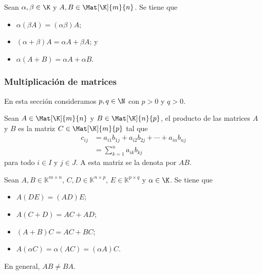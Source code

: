 \documentclass[a4,11pt]{aleph-notas}
\begin{document}
\begin{teo}
    Sean $\alpha,\beta \in \K$ y $A,B\in\Mat[\K]{m}{n}$. Se tiene que
    \begin{itemize}
    \item 
        $\alpha(\beta A) = (\alpha\beta)A$;
    \item 
        $(\alpha+\beta)A = \alpha A + \beta A$; y
    \item 
        $\alpha(A+B) = \alpha A + \alpha B$.
    \end{itemize}
\end{teo}


\subsubsection{Multiplicación de matrices}

En esta sección consideramos  $p,q\in \N$ con $p>0$ y $q>0$.

\begin{defi}
    Sean $A \in \Mat[\K]{m}{n}$ y $B \in \Mat[\K]{n}{p}$, el producto de las matrices $A$ y $B$ es la matriz $C \in \Mat[\K]{m}{p}$ tal que
    \begin{align*}
        c_{ij} & = a_{i1}b_{1j} + a_{i2} b_{2j} + \cdots + a_{in}b_{nj} \\
               & = \sum_{k=1}^n a_{ik} b_{kj}
    \end{align*}
    para todo $i \in I$ y $j \in J$. A esta matriz se la denota por $AB$.
\end{defi}


\begin{teo}
    Sean $A, B\in \mathbb{K}^{m \times n}$, $C,D\in \mathbb{K}^{n \times p}$, $E\in \mathbb{K}^{p \times q}$ y $\alpha \in\K$. Se tiene que
    \begin{itemize}
    \item 
        $A(DE) = (AD)E$;
    \item 
        $A(C+D) = AC + AD$; 
    \item 
        $(A+B)C = AC + BC$; 
    
    \item 
        $A(\alpha C) = \alpha (AC) = (\alpha A) C$.
    \end{itemize}
\end{teo}

\begin{advertencia}
    En general, $AB\neq BA$.
\end{advertencia}
\end{document}
